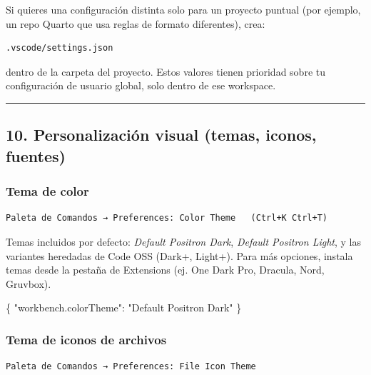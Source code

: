 \documentclass[
  doc,
  floatsintext,
  longtable,
  a4paper,
  nolmodern,
  notxfonts,
  notimes,
  12pt,
  colorlinks=true,linkcolor=blue,citecolor=blue,urlcolor=blue]{apa7}
\newenvironment{Shaded}{\begin{snugshade}}{\end{snugshade}}
\newcommand{\DataTypeTok}[1]{\textcolor[rgb]{0.68,0.00,0.00}{#1}}
\newcommand{\FunctionTok}[1]{\textcolor[rgb]{0.28,0.35,0.67}{#1}}
\newcommand{\StringTok}[1]{\textcolor[rgb]{0.13,0.47,0.30}{#1}}
\begin{document}
Si quieres una configuración distinta solo para un proyecto puntual (por
ejemplo, un repo Quarto que usa reglas de formato diferentes), crea:

\begin{verbatim}
.vscode/settings.json
\end{verbatim}

dentro de la carpeta del proyecto. Estos valores tienen prioridad sobre
tu configuración de usuario global, solo dentro de ese workspace.

\begin{center}\rule{0.5\linewidth}{0.5pt}\end{center}

\subsection{10. Personalización visual (temas, iconos,
fuentes)}\label{personalizaciuxf3n-visual-temas-iconos-fuentes}

\subsubsection{Tema de color}\label{tema-de-color}

\begin{verbatim}
Paleta de Comandos → Preferences: Color Theme   (Ctrl+K Ctrl+T)
\end{verbatim}

Temas incluidos por defecto: \emph{Default Positron Dark}, \emph{Default
Positron Light}, y las variantes heredadas de Code OSS (Dark+, Light+).
Para más opciones, instala temas desde la pestaña de Extensions (ej. One
Dark Pro, Dracula, Nord, Gruvbox).

\begin{Shaded}
\begin{Highlighting}[]
\FunctionTok{\{}
  \DataTypeTok{"workbench.colorTheme"}\FunctionTok{:} \StringTok{"Default Positron Dark"}
\FunctionTok{\}}
\end{Highlighting}
\end{Shaded}

\subsubsection{Tema de iconos de
archivos}\label{tema-de-iconos-de-archivos}

\begin{verbatim}
Paleta de Comandos → Preferences: File Icon Theme
\end{verbatim}
\end{document}
